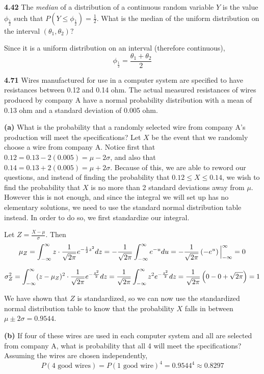 \documentclass{exam}
\begin{document}
\begin{questions}
\newpage
\textbf{4.42 }
The \textit{median} of a distribution of a continuous random variable $Y$ is the value $\phi_\frac{1}{2}$ such that $P(Y \leq \phi_\frac{1}{2}) = \frac{1}{2}$. What is the median of the uniform distribution on the interval $(\theta_1, \theta_2)?$

\sol
Since it is a uniform distribution on an interval (therefore continuous),
$$\phi_\frac{1}{2} = \frac{\theta_1 + \theta_2}{2}$$

\newpage
\textbf{4.71 }
Wires manufactured for use in a computer system are specified to have resistances between 0.12 and 0.14 ohm. The actual measured resistances of wires produced by company A have a normal probability distribution with a mean of 0.13 ohm and a standard deviation of 0.005 ohm.

\newline
\textbf{(a) } What is the probability that a randomly selected wire from company A's production will meet the specifications?
\sol
Let $X$ be the event that we randomly choose a wire from company A. Notice first that $0.12 = 0.13 - 2(0.005) = \mu - 2\sigma$, and also that $0.14 = 0.13 + 2(0.005) = \mu + 2\sigma$. Because of this, we are able to reword our questions, and instead of finding the probability that $0.12 \leq X \leq 0.14$, we wish to find the probability that $X$ is no more than 2 standard deviations away from $\mu$. However this is not enough, and since the integral we will set up has no elementary solutions, we need to use the standard normal distribution table instead. In order to do so, we first standardize our integral.

\newline
Let $Z = \frac{X - \mu}{\sigma}$. Then
$$\mu_Z = \int_{-\infty}^\infty z \cdot \frac{1}{\sqrt{2\pi}}e^{-\frac{1}{2}z^2}dz = -\frac{1}{\sqrt{2\pi}}\int_{-\infty}^\infty e^{-u}du = -\frac{1}{\sqrt{2\pi}}\left( -e^u \right)\Big|_{-\infty}^\infty = 0$$

$$\sigma_Z^2 = \int_{-\infty}^\infty (z - \mu_Z)^2\cdot \frac{1}{\sqrt{2\pi}}e^{-\frac{z^2}{2}}dz = \frac{1}{\sqrt{2\pi}} \int_{-\infty}^\infty z^2e^{-\frac{z^2}{2}}dz = \frac{1}{\sqrt{2\pi}}\left( 0 - 0 + \sqrt{2\pi} \right) = 1$$

We have shown that $Z$ is standardized, so we can now use the standardized normal distribution table to know that the probability $X$ falls in between $\mu \pm 2\sigma = 0.9544$.

\newline
\textbf{(b) } If four of these wires are used in each computer system and all are selected from company A, what is probability that all 4 will meet the specifications?
\sol
Assuming the wires are chosen independently,
$$P(\text{4 good wires}) = P(\text{1 good wire})^4 = 0.9544^4 \approx 0.8297$$


\end{questions}
\end{document}
